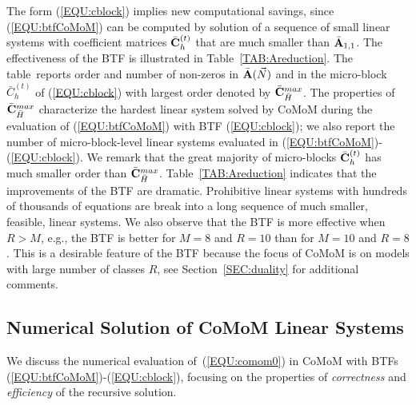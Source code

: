 \documentclass[journal,twocolumn,9.5pt]{IEEEtran}
\newcommand{\comom}[1]{\bar{#1}}
\begin{document}
The form (\ref{EQU:cblock}) implies new computational savings, since (\ref{EQU:btfCoMoM}) can be computed by solution of a sequence of small linear systems with coefficient matrices $\comom{\bf C}^{(t)}_{h}$ that are much smaller than $\comom{\bf A}_{1,1}$. The effectiveness of the BTF is illustrated in Table~\ref{TAB:Areduction}. The table~reports order and number of non-zeros in $\comom{\bf A}(\vec N)$ and in the micro-block $\comom{C}_h^{(t)}$ of (\ref{EQU:cblock}) with largest order denoted by  $\comom{\bf C}^{max}_{{\comom{H}}}$. The properties of $\comom{\bf C}^{max}_{\comom{H}}$ characterize the hardest linear system solved by CoMoM during the evaluation of (\ref{EQU:btfCoMoM}) with BTF (\ref{EQU:cblock}); we also report the number of micro-block-level linear systems evaluated in (\ref{EQU:btfCoMoM})-(\ref{EQU:cblock}). We remark that the great majority of micro-blocks $\comom{\bf C}^{(t)}_{h}$ has much smaller order than $\comom{\bf C}^{max}_{\comom{H}}$. Table~\ref{TAB:Areduction} indicates that the improvements of the BTF are dramatic. Prohibitive linear systems with hundreds of thousands of equations are break into a long sequence of much smaller, feasible, linear systems.
We also observe that the BTF is more effective when $R>M$, e.g., the BTF is better for $M=8$ and $R=10$ than for $M=10$ and $R=8$. This is a desirable feature of the BTF because the focus of CoMoM is on models with large number of classes $R$, see Section~\ref{SEC:duality} for additional comments.

\subsection{Numerical Solution of CoMoM Linear Systems}
\label{SEC:solution}
We discuss the numerical evaluation of~(\ref{EQU:comom0}) in CoMoM with BTFs (\ref{EQU:btfCoMoM})-(\ref{EQU:cblock}), focusing on the properties of \textit{correctness} and \textit{efficiency} of the recursive solution.
\end{document}
